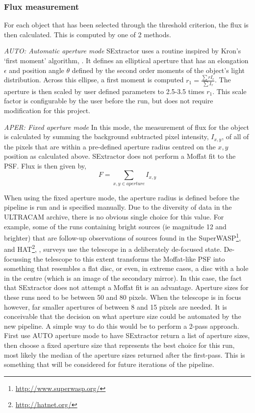 \subsubsection{Flux measurement}
For each object that has been selected through the threshold criterion, the flux is then calculated. This is computed by one of 2 methods. 

\emph{AUTO: Automatic aperture mode}
SExtractor uses a routine inspired by Kron's `first moment' algorithm, \citep{kron}. It defines an elliptical aperture that has an elongation $\epsilon$ and position angle $\theta$ defined by the second order moments of the object's light distribution. Across this ellipse, a first moment is computed $r_1 = \frac{\sum r I_r}{\sum{I_r}}$. The aperture is then scaled by user defined parameters to 2.5-3.5 times $r_1$. This scale factor is configurable by the user before the run, but does not require modification for this project. 

\emph{APER: Fixed aperture mode}
In this mode, the measurement of flux for the object is calculated by summing the background subtracted pixel intensity, $I_{x,y}$,  of all of the pixels that are within a pre-defined aperture radius centred on the $x, y$ position as calculated above. SExtractor does not perform a Moffat fit to the PSF.  Flux is then given by, \begin{equation}F = \sum\limits_{x,y \in aperture}I_{x,y}\end{equation}

When using the fixed aperture mode, the aperture radius is defined before the pipeline is run and is specified manually. Due to the diversity of data in the ULTRACAM archive, there is no obvious single choice for this value. For example, some of the runs containing bright sources (ie magnitude 12 and brighter) that are follow-up observations of sources found in the {SuperWASP}\footnote{\url{http://www.superwasp.org/}}, \citep{PollaccoSuperWASP} and {HAT}\footnote{\url{http://hatnet.org/}}, \citep{BakosHATNet}, surveys use the telescope in a deliberately de-focused state. De-focussing the telescope to this extent transforms the Moffat-like PSF into something that resembles a flat disc, or even, in extreme cases, a disc with a hole in the centre (which is an image of the secondary mirror). In this case, the fact that SExtractor does not attempt a Moffat fit is an advantage. Aperture sizes for these runs need to be between 50 and 80 pixels. When the telescope is in focus however, far smaller apertures of between 8 and 15 pixels are needed. It is conceivable that the decision on what aperture size could be automated by the new pipeline. A simple way to do this would be to perform a 2-pass approach. First use AUTO aperture mode to have SExtractor return a list of aperture sizes, then choose a fixed aperture size that represents the best choice for this run, most likely the median of the aperture sizes returned after the first-pass. This is something that will be considered for future iterations of the pipeline. 

